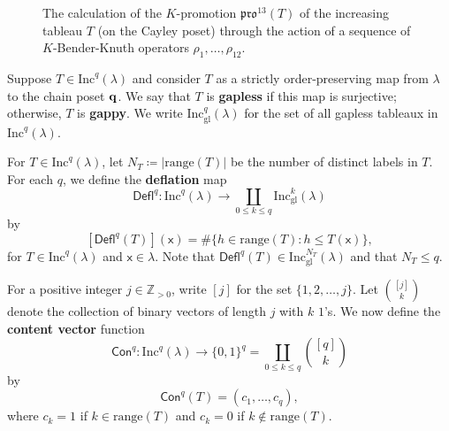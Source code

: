 \documentclass[12pt]{amsart}
\newcommand{\x}{\ensuremath{\mathsf{x}}}
\theoremstyle{definition}
\theoremstyle{remark}
\numberwithin{equation}{section}
\newcommand{\inc}{\ensuremath{\mathrm{Inc}}}
\newcommand{\incgl}{\inc_{\mathrm{gl}}}
\newcommand{\pro}{\mathfrak{pro}}
\newcommand{\deflate}{\ensuremath{\mathsf{Defl}}}
\newcommand{\content}{\ensuremath{\mathsf{Con}}}
\begin{document}
\begin{figure}[h]
\caption{The calculation of the $K$-promotion $\pro^{13}(T)$ of the increasing tableau $T$ (on the Cayley poset) through the action of a sequence of $K$-Bender-Knuth operators $\rho_1, \dots, \rho_{12}$.}\label{fig:promotion}
\end{figure}

Suppose $T \in \inc^q(\lambda)$ and consider $T$ as a strictly order-preserving map from $\lambda$ to the chain poset ${\bf q}$. We say that $T$ is {\bf gapless} if this map is surjective; otherwise, $T$ is {\bf gappy}. We write $\incgl^q(\lambda)$ for the set of all gapless tableaux in $\inc^q(\lambda)$.

For $T \in \inc^q(\lambda)$, let $N_T \coloneqq |\mathrm{range}(T)|$ be the number of distinct labels in $T$. For each $q$, we define the {\bf deflation} map \[\deflate^q : \inc^q(\lambda) \to \coprod_{0 \leq k \leq q} \incgl^k(\lambda)\] by
\[
[\deflate^q(T)](\x) =
\# \{ h \in \mathrm{range}(T): h \leq T(\x) \} ,
\]
for $T \in \inc^q(\lambda)$ and $\x \in \lambda$. Note that $\deflate^q(T) \in \incgl^{N_T}(\lambda)$ and that $N_T \leq q$.

For a positive integer $j \in \mathbb{Z}_{>0}$, write $[j]$ for the set $\{ 1, 2, \dots, j\}$. Let $\binom{[j]}{k}$ denote the collection of binary vectors of length $j$ with $k$ $1$'s. We now define the {\bf content vector} function 
\[
 \content^q : \inc^q(\lambda) \to \{ 0, 1\}^q = \coprod_{0 \leq  k \leq q} \binom{[q]}{k}
 \] 
 by 
\[
\content^q(T) = (c_1, \dots, c_q),
\] 
where $c_k = 1$ if $k \in \mathrm{range}(T)$ and $c_k = 0$ if $k \notin \mathrm{range}(T)$.
\end{document}
